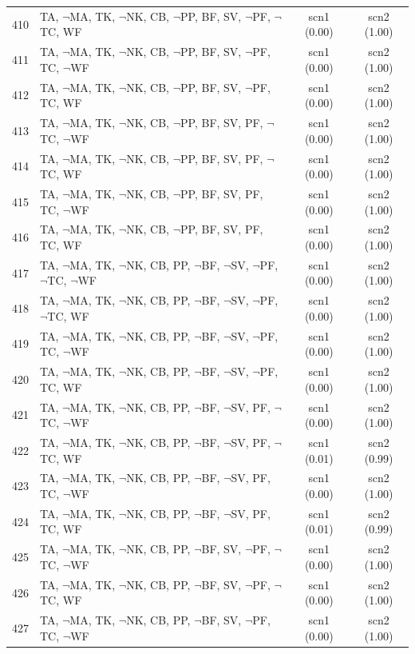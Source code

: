 \documentclass[12pt]{article}
\begin{document}
\begin{longtable}{|l|l|c|c|}
410 & TA, $\neg$MA, TK, $\neg$NK, CB, $\neg$PP, BF, SV, $\neg$PF, $\neg$TC, WF & scn1 (0.00) & scn2 (1.00)\\
411 & TA, $\neg$MA, TK, $\neg$NK, CB, $\neg$PP, BF, SV, $\neg$PF, TC, $\neg$WF & scn1 (0.00) & scn2 (1.00)\\
412 & TA, $\neg$MA, TK, $\neg$NK, CB, $\neg$PP, BF, SV, $\neg$PF, TC, WF & scn1 (0.00) & scn2 (1.00)\\
413 & TA, $\neg$MA, TK, $\neg$NK, CB, $\neg$PP, BF, SV, PF, $\neg$TC, $\neg$WF & scn1 (0.00) & scn2 (1.00)\\
414 & TA, $\neg$MA, TK, $\neg$NK, CB, $\neg$PP, BF, SV, PF, $\neg$TC, WF & scn1 (0.00) & scn2 (1.00)\\
415 & TA, $\neg$MA, TK, $\neg$NK, CB, $\neg$PP, BF, SV, PF, TC, $\neg$WF & scn1 (0.00) & scn2 (1.00)\\
416 & TA, $\neg$MA, TK, $\neg$NK, CB, $\neg$PP, BF, SV, PF, TC, WF & scn1 (0.00) & scn2 (1.00)\\
417 & TA, $\neg$MA, TK, $\neg$NK, CB, PP, $\neg$BF, $\neg$SV, $\neg$PF, $\neg$TC, $\neg$WF & scn1 (0.00) & scn2 (1.00)\\
418 & TA, $\neg$MA, TK, $\neg$NK, CB, PP, $\neg$BF, $\neg$SV, $\neg$PF, $\neg$TC, WF & scn1 (0.00) & scn2 (1.00)\\
419 & TA, $\neg$MA, TK, $\neg$NK, CB, PP, $\neg$BF, $\neg$SV, $\neg$PF, TC, $\neg$WF & scn1 (0.00) & scn2 (1.00)\\
420 & TA, $\neg$MA, TK, $\neg$NK, CB, PP, $\neg$BF, $\neg$SV, $\neg$PF, TC, WF & scn1 (0.00) & scn2 (1.00)\\
421 & TA, $\neg$MA, TK, $\neg$NK, CB, PP, $\neg$BF, $\neg$SV, PF, $\neg$TC, $\neg$WF & scn1 (0.00) & scn2 (1.00)\\
422 & TA, $\neg$MA, TK, $\neg$NK, CB, PP, $\neg$BF, $\neg$SV, PF, $\neg$TC, WF & scn1 (0.01) & scn2 (0.99)\\
423 & TA, $\neg$MA, TK, $\neg$NK, CB, PP, $\neg$BF, $\neg$SV, PF, TC, $\neg$WF & scn1 (0.00) & scn2 (1.00)\\
424 & TA, $\neg$MA, TK, $\neg$NK, CB, PP, $\neg$BF, $\neg$SV, PF, TC, WF & scn1 (0.01) & scn2 (0.99)\\
425 & TA, $\neg$MA, TK, $\neg$NK, CB, PP, $\neg$BF, SV, $\neg$PF, $\neg$TC, $\neg$WF & scn1 (0.00) & scn2 (1.00)\\
426 & TA, $\neg$MA, TK, $\neg$NK, CB, PP, $\neg$BF, SV, $\neg$PF, $\neg$TC, WF & scn1 (0.00) & scn2 (1.00)\\
427 & TA, $\neg$MA, TK, $\neg$NK, CB, PP, $\neg$BF, SV, $\neg$PF, TC, $\neg$WF & scn1 (0.00) & scn2 (1.00)\\

\end{longtable}
\end{document}
